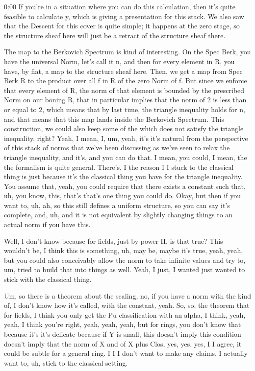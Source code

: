 \begin{unfinished}{0:00}
If you're in a situation where you can do this calculation, then it's quite feasible to calculate y, which is giving a presentation for this stack. We also saw that the Descent for this cover is quite simple; it happens at the zero stage, so the structure sheaf here will just be a retract of the structure sheaf there.

The map to the Berkovich Spectrum is kind of interesting. On the Spec Berk, you have the universal Norm, let's call it n, and then for every element in R, you have, by fiat, a map to the structure sheaf here. Then, we get a map from Spec Berk R to the product over all f in R of the zero Norm of f. But since we enforce that every element of R, the norm of that element is bounded by the prescribed Norm on our boning R, that in particular implies that the norm of 2 is less than or equal to 2, which means that by last time, the triangle inequality holds for n, and that means that this map lands inside the Berkovich Spectrum.
This construction, we could also keep some of the which does not satisfy the triangle inequality, right? Yeah, I mean, I, um, yeah, it's it's natural from the perspective of this stack of norms that we've been discussing as we've seen to relax the triangle inequality, and it's, and you can do that. I mean, you could, I mean, the the formalism is quite general. There's, I the reason I I stuck to the classical thing is just because it's the classical thing you have for the triangle inequality. You assume that, yeah, you could require that there exists a constant such that, uh, you know, this, that's that's one thing you could do. Okay, but then if you want to, uh, ah, so this still defines a uniform structure, so you can say it's complete, and, uh, and it is not equivalent by slightly changing things to an actual norm if you have this. 

Well, I don't know because for fields, just by power H, is that true? This wouldn't be, I think this is something, uh, may be, maybe it's true, yeah, yeah, but you could also conceivably allow the norm to take infinite values and try to, um, tried to build that into things as well. Yeah, I just, I wanted just wanted to stick with the classical thing.

Um, so there is a theorem about the scaling, no, if you have a norm with the kind of, I don't know how it's called, with the constant, yeah. So, so, the theorem that for fields, I think you only get the Pu classification with an alpha, I think, yeah, yeah, I think you're right, yeah, yeah, yeah, but for rings, you don't know that because it's it's delicate because if Y is small, this doesn't imply this condition doesn't imply that the norm of X and of X plus Clos, yes, yes, yes, I I agree, it could be subtle for a general ring. I I I don't want to make any claims. I actually want to, uh, stick to the classical setting.


\end{unfinished}
